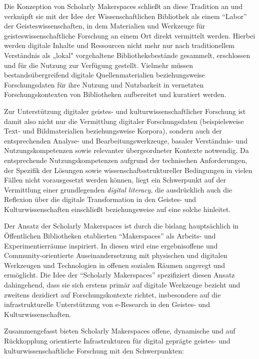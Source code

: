 \documentclass[a4paper,
fontsize=11pt,
oneside,
numbers=noperiodatend,
parskip=half-,
bibliography=totoc,
final
]{scrartcl}
\begin{document}
Die Konzeption von Scholarly Makerspaces schließt an diese Tradition an
und verknüpft sie mit der Idee der Wissenschaftlichen Bibliothek als
einem \enquote{Labor} der Geisteswissenschaften, in dem Materialien und
Werkzeuge für geisteswissenschaftliche Forschung an einem Ort direkt
vermittelt werden. Hierbei werden digitale Inhalte und Ressourcen nicht
mehr nur nach traditionellem Verständnis als „lokal" vorgehaltene
Bibliotheksbestände gesammelt, erschlossen und für die Nutzung zur
Verfügung gestellt. Vielmehr müssen bestandsübergreifend digitale
Quellenmaterialien beziehungsweise Forschungsdaten für ihre Nutzung und
Nutzbarkeit in vernetzten Forschungskontexten von Bibliotheken
aufbereitet und kuratiert werden.

Zur Unterstützung digitaler geistes- und kulturwissenschaftlicher
Forschung ist damit also nicht nur die Vermittlung digitaler
Forschungsdaten (beispielsweise Text- und Bildmaterialien
beziehungsweise Korpora), sondern auch der entsprechenden Analyse- und
Bearbeitungswerkzeuge, basaler Verständnis- und Nutzungskompetenzen
sowie relevanter übergeordneter Kontexte notwendig. Da entsprechende
Nutzungskompetenzen aufgrund der technischen Anforderungen, der Spezifik
der Lösungen sowie wissenschaftsstruktureller Bedingungen in vielen
Fällen nicht vorausgesetzt werden können, liegt ein Schwerpunkt auf der
Vermittlung einer grundlegenden \emph{digital literacy}, die
ausdrücklich auch die Reflexion über die digitale Transformation in den
Geistes- und Kulturwissenschaften einschließt beziehungsweise auf eine
solche hinleitet.

Der Ansatz der Scholarly Makerspaces ist durch die bislang hauptsächlich
in Öffentlichen Bibliotheken etablierten \enquote{Makerspaces} als
Arbeits- und Experimentierräume inspiriert. In diesen wird eine
ergebnisoffene und Community-orientierte Auseinandersetzung mit
physischen und digitalen Werkzeugen und Technologien in offenen sozialen
Räumen angeregt und ermöglicht. Die Idee der \enquote{Scholarly
Makerspaces} spezifiziert diesen Ansatz dahingehend, dass sie sich
erstens primär auf digitale Werkzeuge bezieht und zweitens dezidiert auf
Forschungskontexte richtet, insbesondere auf die infrastrukturelle
Unterstützung von e-Research in den Geistes- und Kulturwissenschaften.

Zusammengefasst bieten Scholarly Makerspaces offene, dynamische und auf
Rückkopplung orientierte Infrastrukturen für digital geprägte geistes-
und kulturwissenschaftliche Forschung mit den Schwerpunkten:
\end{document}
